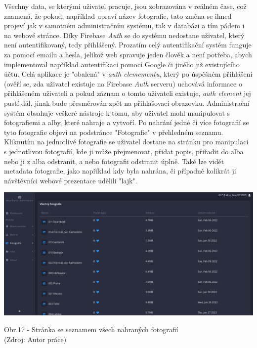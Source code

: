 \documentclass[12pt,a4paper]{report}
\begin{document}
  Všechny data, se kterými uživatel pracuje, jsou zobrazována v reálném čase, což znamená, že
  pokud, například upraví název fotografie, tato změna se ihned projeví jak v samotném
  administračním systému, tak v databázi a tím pádem i na webové stránce.
  Díky Firebase \emph{Auth} se do systému nedostane uživatel, který není autentifikovaný, tedy přihlášený.
  Prozatím celý autentifikační systém funguje za pomocí emailu a hesla, jelikož web spravuje jeden
  člověk a není potřeba, abych implementoval například autentifikaci pomocí Google či jiného již
  existujícího účtu.
  Celá aplikace je "obalená" v \emph{auth elemementu}, který po úspěšném přihlášení (ověří se, zda
  uživatel existuje na Firebase \emph{Auth} serveru) uchovává informace o přihlášeném uživateli a pokud
  záznam o tomto uživateli existuje, \emph{auth element} jej pustí dál, jinak bude přesměrován zpět na
  přihlašovací obrazovku.
  Administrační systém obsahuje veškeré nástroje k tomu, aby uživatel mohl manipulovat s
  fotografiemi a alby, které nahraje a vytvoří. Po nahrání jedné či více fotografií se tyto fotografie
  objeví na podstránce "Fotografie" v přehledném seznamu. Kliknutím na jednotlivé fotografie se
  uživatel dostane na stránku pro manipulaci s jednotlivou fotografií, kde ji může přejmenovat,
  přidat popis, přiřadit do alba nebo ji z alba odstranit, a nebo fotografii odstranit úplně. Také lze
  vidět metadata fotografie, jako například kdy byla nahrána, či případně kolikrát ji návštěvníci
  webové prezentace udělili "lajk".

  \vspace*{0.5cm}
  \noindent\includegraphics[width=\linewidth]{allPhotos.png}
  \begin{center}
    Obr.17 - Stránka se seznamem všech nahraných fotografií \\
    (Zdroj: Autor práce)
  \end{center}
  \vspace*{0.5cm}
\end{document}
